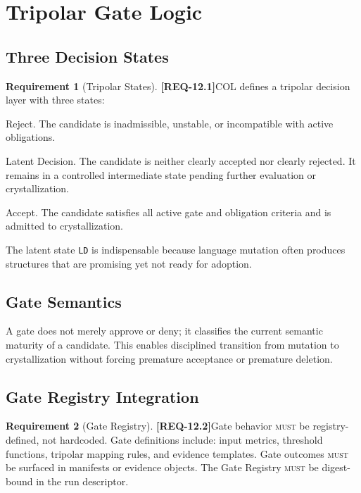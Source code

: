 \documentclass[11pt,a4paper,twoside]{article}
\theoremstyle{definition}
\newtheorem{requirement}{Requirement}[section]
\theoremstyle{remark}
\newcommand{\req}[1]{\textbf{\textcolor{reqred}{[REQ-#1]}}}
\newcommand{\must}{\textsc{must}}
\begin{document}

\section{Tripolar Gate Logic}
\label{sec:tripolar}

\subsection{Three Decision States}

\begin{requirement}[Tripolar States]
\label{req:tripolar-states}
\req{12.1}\quad COL defines a tripolar decision layer with three states:
\begin{description}[nosep,leftmargin=2cm]
  \item[\texttt{0}] Reject. The candidate is inadmissible, unstable, or incompatible with active obligations.
  \item[\texttt{LD}] Latent Decision. The candidate is neither clearly accepted nor clearly rejected. It remains in a controlled intermediate state pending further evaluation or crystallization.
  \item[\texttt{1}] Accept. The candidate satisfies all active gate and obligation criteria and is admitted to crystallization.
\end{description}
The latent state \texttt{LD} is indispensable because language mutation often produces structures that are promising yet not ready for adoption.
\end{requirement}

\subsection{Gate Semantics}

A gate does not merely approve or deny; it classifies the current semantic maturity of a candidate. This enables disciplined transition from mutation to crystallization without forcing premature acceptance or premature deletion.

\subsection{Gate Registry Integration}

\begin{requirement}[Gate Registry]
\label{req:gate-registry}
\req{12.2}\quad Gate behavior \must{} be registry-defined, not hardcoded. Gate definitions include: input metrics, threshold functions, tripolar mapping rules, and evidence templates. Gate outcomes \must{} be surfaced in manifests or evidence objects. The Gate Registry \must{} be digest-bound in the run descriptor.
\end{requirement}
\end{document}
